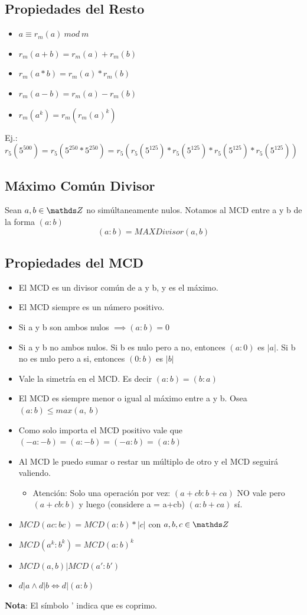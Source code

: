 \documentclass[10pt,a4paper]{article}
\begin{document}
\subsection*{Propiedades del Resto}
\begin{itemize}
    \item $a \equiv r_{m}(a) \ mod \ m$
    \item $r_{m}(a+b) = r_{m}(a) + r_{m}(b)$
    \item $r_{m}(a*b) = r_{m}(a) * r_{m}(b)$
    \item $r_{m}(a-b) = r_{m}(a) - r_{m}(b)$
    \item $r_{m}(a^{k}) = r_{m}(r_{m}(a)^{k})$
\end{itemize}
Ej.: $r_{5}(5^{500}) = r_{5}(5^{250} * 5^{250}) = r_{5}(r_{5}(5^{125}) * r_{5}(5^{125}) * r_{5}(5^{125}) * r_{5}(5^{125}))$
\subsection*{Máximo Común Divisor}
Sean $a, b \in \ent$ no simúltaneamente nulos. Notamos al MCD entre a y b de la forma $(a:b)$ \\
\[(a:b) = MAX Divisor(a, b)\]
\subsection*{Propiedades del MCD}
\begin{itemize}
    \item El MCD es un divisor común de a y b, y es el máximo.
    \item El MCD siempre es un número positivo.
    \item Si a y b son ambos nulos $\implies (a:b) = 0$
    \item Si a y b no ambos nulos. Si b es nulo pero a no, entonces $(a:0)$ es $|a|$. Si b no es nulo pero a si, entonces $(0:b)$ es $|b|$
    \item Vale la simetría en el MCD. Es decir $(a:b) = (b:a)$
    \item El MCD es siempre menor o igual al máximo entre a y b. Osea $(a:b) \le max(a, \ b)$
    \item Como solo importa el MCD positivo vale que $(-a:-b)=(a:-b)=(-a:b)=(a:b)$
    \item Al MCD le puedo sumar o restar un múltiplo de otro y el MCD seguirá valiendo.
    \begin{itemize}
        \item Atención: Solo una operación por vez: $(a+cb:b+ca)$ NO vale pero $(a+cb:b)$ y luego (considere a = a+cb) $(a:b+ca)$ sí.
    \end{itemize}
    \item $MCD(ac:bc) = MCD(a:b) * |c|$ con $a, b, c \in \ent$
    \item $MCD(a^{k}:b^{k}) = MCD(a:b)^{k}$
    \item $MCD(a, b) | MCD(a':b')$
    \item $d | a \land d | b \iff d | (a:b)$
\end{itemize}
\textbf{Nota}: El símbolo ' indica que es coprimo.
\end{document}
